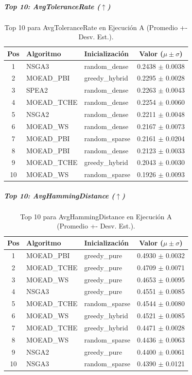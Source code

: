 \documentclass[a4paper,10pt]{article}
\begin{document}
\subparagraph{Top 10: AvgToleranceRate ($\uparrow$)}
\begin{table}[H]
    \centering
    \begin{tabular}{cllc}
        \toprule
        Pos & Algoritmo & Inicialización & Valor ($\mu \pm \sigma$) \\
        \midrule
        1 & NSGA3 & random\_dense & 0.2438 $\pm$ 0.0038 \\
        2 & MOEAD\_PBI & greedy\_hybrid & 0.2295 $\pm$ 0.0028 \\
        3 & SPEA2 & random\_dense & 0.2263 $\pm$ 0.0043 \\
        4 & MOEAD\_TCHE & random\_dense & 0.2254 $\pm$ 0.0060 \\
        5 & NSGA2 & random\_dense & 0.2211 $\pm$ 0.0048 \\
        6 & MOEAD\_WS & random\_dense & 0.2167 $\pm$ 0.0073 \\
        7 & MOEAD\_PBI & random\_sparse & 0.2161 $\pm$ 0.0204 \\
        8 & MOEAD\_PBI & random\_dense & 0.2123 $\pm$ 0.0033 \\
        9 & MOEAD\_TCHE & greedy\_hybrid & 0.2043 $\pm$ 0.0030 \\
        10 & MOEAD\_WS & random\_sparse & 0.1926 $\pm$ 0.0093 \\
        \bottomrule
    \end{tabular}
    \caption{Top 10 para AvgToleranceRate en Ejecución A (Promedio +- Desv. Est.).}
\end{table}

\subparagraph{Top 10: AvgHammingDistance ($\uparrow$)}
\begin{table}[H]
    \centering
    \begin{tabular}{cllc}
        \toprule
        Pos & Algoritmo & Inicialización & Valor ($\mu \pm \sigma$) \\
        \midrule
        1 & MOEAD\_PBI & greedy\_pure & 0.4930 $\pm$ 0.0032 \\
        2 & MOEAD\_TCHE & greedy\_pure & 0.4709 $\pm$ 0.0071 \\
        3 & MOEAD\_WS & greedy\_pure & 0.4653 $\pm$ 0.0095 \\
        4 & NSGA3 & greedy\_pure & 0.4551 $\pm$ 0.0085 \\
        5 & MOEAD\_TCHE & random\_sparse & 0.4544 $\pm$ 0.0080 \\
        6 & MOEAD\_WS & greedy\_hybrid & 0.4521 $\pm$ 0.0085 \\
        7 & MOEAD\_TCHE & greedy\_hybrid & 0.4471 $\pm$ 0.0028 \\
        8 & MOEAD\_WS & random\_sparse & 0.4436 $\pm$ 0.0063 \\
        9 & NSGA2 & greedy\_pure & 0.4400 $\pm$ 0.0061 \\
        10 & NSGA3 & random\_sparse & 0.4390 $\pm$ 0.0121 \\
        \bottomrule
    \end{tabular}
    \caption{Top 10 para AvgHammingDistance en Ejecución A (Promedio +- Desv. Est.).}
\end{table}
\end{document}
